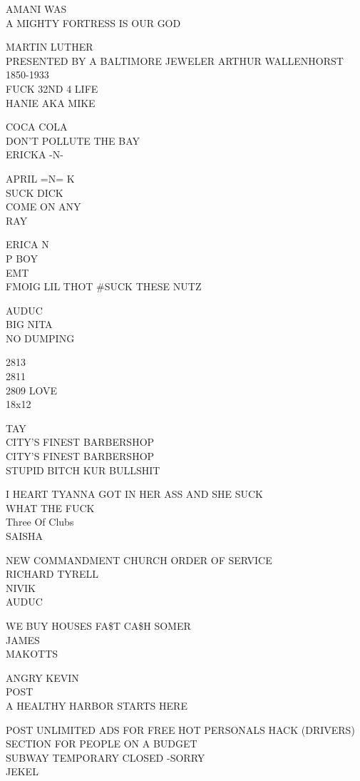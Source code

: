 \documentclass[10pt,letterpaper]{article}
\begin{document}
AMANI WAS\\
A MIGHTY FORTRESS IS OUR GOD

MARTIN LUTHER\\
PRESENTED BY A BALTIMORE JEWELER ARTHUR WALLENHORST 1850{-}1933\\
FUCK 32ND 4 LIFE\\
HANIE AKA MIKE

COCA COLA\\
DON'T POLLUTE THE BAY\\
ERICKA {-}N{-}

APRIL =N= K\\
SUCK DICK\\
COME ON ANY\\
RAY

ERICA N\\
P BOY\\
EMT\\
FMOIG LIL THOT \#SUCK THESE NUTZ

AUDUC\\
BIG NITA\\
NO DUMPING

2813\\
2811\\
2809 LOVE\\
18x12

TAY\\
CITY'S FINEST BARBERSHOP\\
CITY'S FINEST BARBERSHOP\\
STUPID BITCH KUR BULLSHIT

I HEART TYANNA GOT IN HER ASS AND SHE SUCK\\
WHAT THE FUCK\\
Three Of Clubs\\
SAISHA

NEW COMMANDMENT CHURCH ORDER OF SERVICE\\
RICHARD TYRELL\\
NIVIK\\
AUDUC

WE BUY HOUSES FA\$T CA\$H SOMER\\
JAMES\\
MAKOTTS

ANGRY KEVIN\\
POST\\
A HEALTHY HARBOR STARTS HERE

POST UNLIMITED ADS FOR FREE HOT PERSONALS HACK (DRIVERS) SECTION FOR PEOPLE ON A BUDGET\\
SUBWAY TEMPORARY CLOSED {-}SORRY\\
JEKEL
\end{document}
